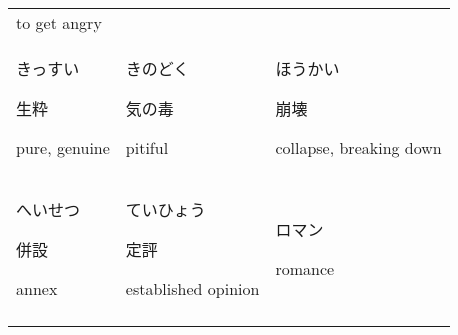 \documentclass[12pt, a4j, landscape, dvipdfmx]{utarticle}
\begin{document}
\begin{minipage}[t][0pt]{\linewidth }
\begin{tabular}{||p{5.5cm}||p{5.5cm}||p{5.5cm}||}
{            to get angry}\tabularnewline
            \hhline{|:=::=::=:|} \rule{0pt}{3ex}
            \hspace*{-.4cm} {\LARGE きっすい}\newline
            \rule{0pt}{3ex} \hspace*{.4cm} {\small
            生粋}\newline \rule{0pt}{3ex} \hspace*{.425cm}
            {\small pure, genuine}&\rule{0pt}{3ex}
            \hspace*{-.4cm} {\LARGE きのどく}\newline
            \rule{0pt}{3ex} \hspace*{.4cm} {\small
            気の毒}\newline \rule{0pt}{3ex} \hspace*{.425cm}
            {\small pitiful}&\rule{0pt}{3ex} \hspace*{-.4cm}
            {\LARGE ほうかい}\newline \rule{0pt}{3ex}
            \hspace*{.4cm} {\small 崩壊}\newline
            \rule{0pt}{3ex} \hspace*{.425cm} {\small
            collapse, breaking down}\tabularnewline
            \hhline{|:=::=::=:|} \rule{0pt}{3ex}
            \hspace*{-.4cm} {\LARGE へいせつ}\newline
            \rule{0pt}{3ex} \hspace*{.4cm} {\small
            併設}\newline \rule{0pt}{3ex} \hspace*{.425cm}
            {\small annex}&\rule{0pt}{3ex} \hspace*{-.4cm}
            {\LARGE ていひょう}\newline \rule{0pt}{3ex}
            \hspace*{.4cm} {\small 定評}\newline
            \rule{0pt}{3ex} \hspace*{.425cm} {\small
            established opinion}&\rule{0pt}{3ex}
            \hspace*{-.4cm} {\LARGE ロマン}\newline
            \rule{0pt}{3ex} \hspace*{.4cm} {\small }\newline
            \rule{0pt}{3ex} \hspace*{.425cm} {\small
            romance}\tabularnewline \hhline{|:=::=::=:|}

\end{tabular}
\end{minipage}
\end{document}
